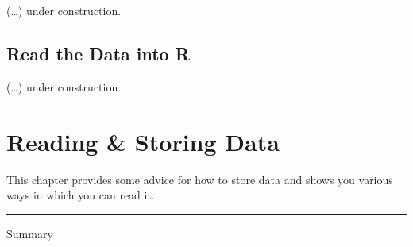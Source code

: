 \documentclass[
]{book}
\begin{document}
(\ldots) under construction.

\hypertarget{read-the-data-into-r-1}{%
\section{Read the Data into R}\label{read-the-data-into-r-1}}

(\ldots) under construction.

\hypertarget{reading-storing-data}{%
\chapter{Reading \& Storing Data}\label{reading-storing-data}}

This chapter provides some advice for how to store data and shows you various ways in which you can read it.

\begin{center}\rule{0.5\linewidth}{0.5pt}\end{center}

Summary
\end{document}
